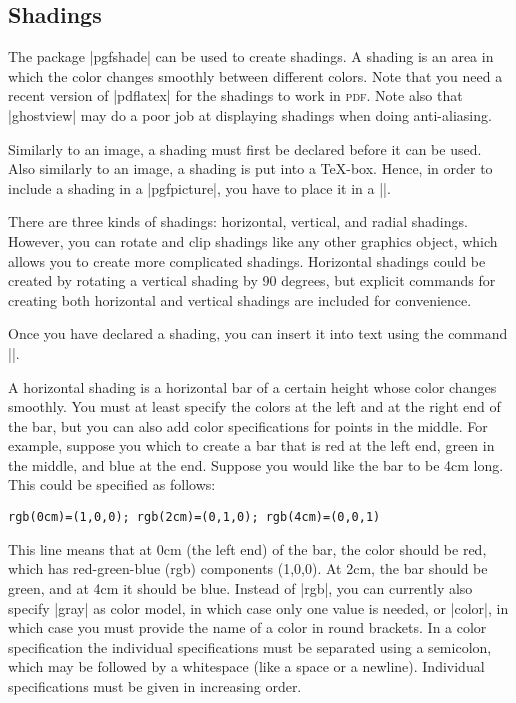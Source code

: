 \documentclass{ltxdoc}
\begin{document}
\subsection{Shadings}

The package |pgfshade| can be used to create shadings. A shading
is an area in which the color changes smoothly between different
colors. Note that you need a recent version of |pdflatex| for the
shadings to work in \textsc{pdf}. Note also that |ghostview| may do a
poor job at displaying shadings when doing anti-aliasing.

Similarly to an image, a shading must first be declared before it can
be used. Also similarly to an image, a shading is put into a
\TeX-box. Hence, in order to include a shading in a |pgfpicture|,
you have to place it in a |\pgfbox|.

There are three kinds of shadings: horizontal, vertical, and radial
shadings. However, you can rotate and clip shadings like any other
graphics object, which allows you to create more complicated
shadings. Horizontal shadings could be created by rotating a vertical
shading by 90 degrees, but explicit commands for creating both
horizontal and vertical shadings are included for convenience.

Once you have declared a shading, you can insert it into text using
the command |\pgfuseshading|.

A horizontal shading is a horizontal bar of a certain height whose
color changes smoothly. You must at least specify the colors at the
left and at the right end of the bar, but you can also add color
specifications for points in the middle. For example, suppose you
which to create a bar that is red at the left end, green in the
middle, and blue at the end. Suppose you would like the bar to be 4cm
long. This could be specified as follows:
\begin{verbatim}
rgb(0cm)=(1,0,0); rgb(2cm)=(0,1,0); rgb(4cm)=(0,0,1)
\end{verbatim}
This line means that at 0cm (the left end) of the bar, the color
should be red, which has red-green-blue (rgb) components (1,0,0). At
2cm, the bar should be green, and at 4cm it should be blue.
Instead of |rgb|, you can currently also specify |gray| as
color model, in which case only one value is needed, or |color|,
in which case you must provide the name of a color in round
brackets. In a color specification the individual specifications must
be separated using a semicolon, which may be followed by a whitespace
(like a space or a newline). Individual specifications must be given
in increasing order. 
\end{document}
